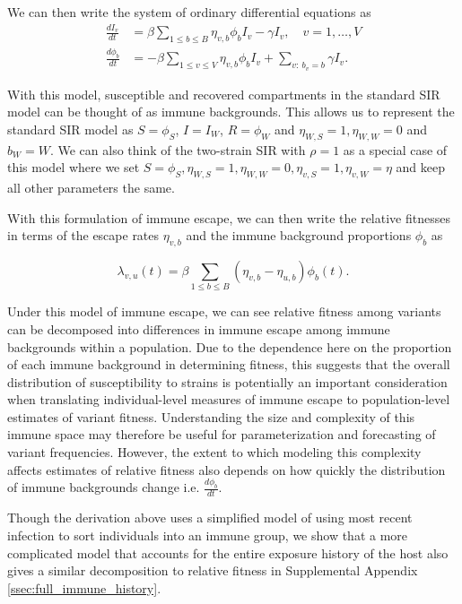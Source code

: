 \documentclass[12pt,oneside,letterpaper]{article}
\newcommand{\wt}{W}
\newcommand{\varEscape}{\eta}
\newcommand{\varTransmission}{\rho}
\begin{document}
We can then write the system of ordinary differential equations as
\begin{align*}
    \frac{d I_{v}}{dt} &= \beta \sum_{1\leq b \leq B} \varEscape_{v, b} \phi_{b} I_{v} - \gamma I_{v}, \quad v = 1, \ldots, V\\
    \frac{d \phi_{b}}{dt} &= - \beta \sum_{1\leq v \leq V} \varEscape_{v,b}\phi_{b} I_{v} +  \sum_{v:\ b_{v} = b} \gamma I_{v}.
\end{align*}

With this model, susceptible and recovered compartments in the standard SIR model can be thought of as immune backgrounds.
This allows us to represent the standard SIR model as $S = \phi_{S}$, $I = I_{\wt}$, $R = \phi_{\wt}$ and $\varEscape_{\wt, S} = 1, \varEscape_{\wt, \wt} = 0$ and $b_{\wt} = \wt$.
We can also think of the two-strain SIR with $\varTransmission = 1$ as a special case of this model where we set $S = \phi_{S}, \varEscape_{\wt, S} = 1, \varEscape_{\wt, \wt} = 0, \varEscape_{v, S} = 1, \varEscape_{v, \wt} = \varEscape$ and keep all other parameters the same.

With this formulation of immune escape, we can then write the relative fitnesses in terms of the escape rates $\varEscape_{v,b}$ and the immune background proportions $\phi_{b}$ as

\begin{equation} \label{eq:escape_relative_fitness}
    \lambda_{v, u}(t) = \beta \sum_{1\leq b \leq B}(\varEscape_{v,b} - \varEscape_{u,b}) \phi_{b}(t).
\end{equation}

Under this model of immune escape, we can see relative fitness among variants can be decomposed into differences in immune escape among immune backgrounds within a population.
Due to the dependence here on the proportion of each immune background in determining fitness, this suggests that the overall distribution of susceptibility to strains is potentially an important consideration when translating individual-level measures of immune escape to population-level estimates of variant fitness.
Understanding the size and complexity of this immune space may therefore be useful for parameterization and forecasting of variant frequencies.
However, the extent to which modeling this complexity affects estimates of relative fitness also depends on how quickly the distribution of immune backgrounds change i.e. $\frac{d\phi_{b}}{dt}$.

Though the derivation above uses a simplified model of using most recent infection to sort individuals into an immune group, we show that a more complicated model that accounts for the entire exposure history of the host also gives a similar decomposition to relative fitness in Supplemental Appendix \ref{ssec:full_immune_history}.
\end{document}
